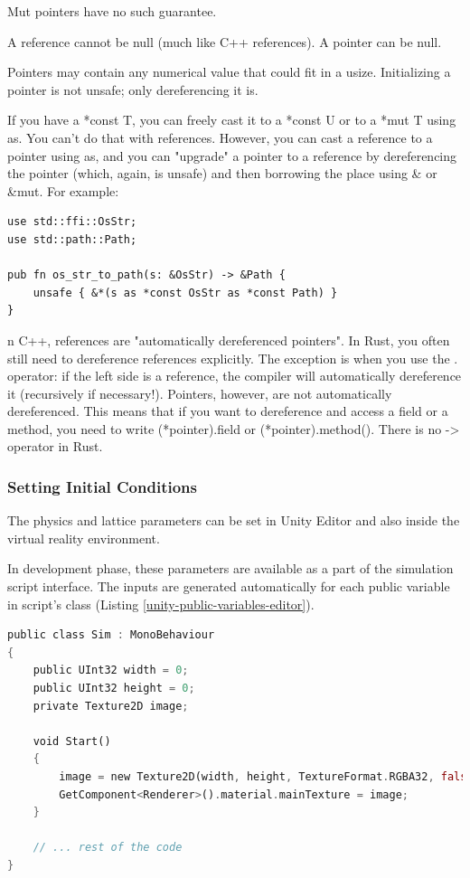 Mut pointers have no such guarantee.

A reference cannot be null (much like C++ references). A pointer can be null.

Pointers may contain any numerical value that could fit in a usize. Initializing a pointer is not unsafe; only dereferencing it is.

If you have a *const T, you can freely cast it to a *const U or to a *mut T using as. You can't do that with references. However, you can cast a reference to a pointer using as, and you can "upgrade" a pointer to a reference by dereferencing the pointer (which, again, is unsafe) and then borrowing the place using \& or \&mut. For example:

\begin{lstlisting}
use std::ffi::OsStr;
use std::path::Path;

pub fn os_str_to_path(s: &OsStr) -> &Path {
	unsafe { &*(s as *const OsStr as *const Path) }
}
\end{lstlisting}

n C++, references are "automatically dereferenced pointers". In Rust, you often still need to dereference references explicitly. The exception is when you use the . operator: if the left side is a reference, the compiler will automatically dereference it (recursively if necessary!). Pointers, however, are not automatically dereferenced. This means that if you want to dereference and access a field or a method, you need to write (*pointer).field or (*pointer).method(). There is no -> operator in Rust.



\subsubsection{Setting Initial Conditions}

The physics and lattice parameters can be set in Unity Editor and also inside the virtual reality environment.

In development phase, these parameters are available as a part of the simulation script interface. The inputs are generated automatically for each public variable in script's class (Listing \ref{unity-public-variables-editor}).

\begin{lstlisting}[language=Rust, caption=Boundary conditions at solid nodes., label=unity-public-variables-editor]
public class Sim : MonoBehaviour
{
	public UInt32 width = 0;
	public UInt32 height = 0;
	private Texture2D image;
	
	void Start()
	{
		image = new Texture2D(width, height, TextureFormat.RGBA32, false);
		GetComponent<Renderer>().material.mainTexture = image;
	}
	
	// ... rest of the code
}
\end{lstlisting}

